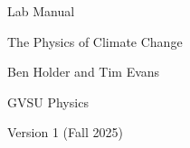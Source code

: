 \documentclass[letter,12pt]{book}
\begin{document}
\begin{titlepage}
    \centering
    \vspace*{\fill}
    {\Huge Lab Manual\par}
    {\Large The Physics of Climate Change\par}
    \vspace{1in}
    {\large Ben Holder and Tim Evans\par}
    {\large GVSU Physics\par}
    Version 1 (Fall 2025)
    \vspace*{\fill}
\end{titlepage}


\tableofcontents
























\end{document}
